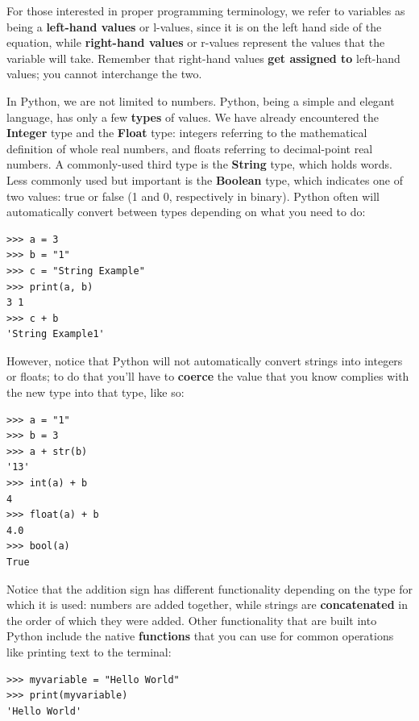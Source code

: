 \documentclass[a4paper,11pt]{article}
\begin{document}
For those interested in proper programming terminology, we refer to variables as being a \textbf{left-hand values} or l-values, 
since it is on the left hand side of the equation, while \textbf{right-hand values} or r-values represent the values that the variable
will take.  Remember that right-hand values \textbf{get assigned to} left-hand values; you cannot interchange the two. \par
In Python, we are not limited to numbers.  Python, being a simple and elegant language, has only a few \textbf{types} of
values.  We have already encountered the \textbf{Integer} type and the \textbf{Float} type: integers referring to
the mathematical definition of whole real numbers, and floats referring to decimal-point real numbers.
A commonly-used third type is the \textbf{String} type, which holds words.  Less commonly used but important is the 
\textbf{Boolean} type, which indicates one of two values: true or false (1 and 0, respectively in binary).
Python often will automatically convert between types depending on what you need to do:

\vspace{3mm}
\begin{lstlisting}
>>> a = 3
>>> b = "1"
>>> c = "String Example"
>>> print(a, b)
3 1
>>> c + b
'String Example1'
\end{lstlisting}
\vspace{3mm}

However, notice that Python will not automatically convert strings into integers or floats; to do that you'll have to \textbf{coerce} 
the value that you know complies with the new type into that type, like so:

\vspace{3mm}
\begin{lstlisting}
>>> a = "1"
>>> b = 3
>>> a + str(b)
'13'
>>> int(a) + b
4
>>> float(a) + b
4.0
>>> bool(a)
True
\end{lstlisting}
\vspace{3mm}

Notice that the addition sign has different functionality depending on the type for which it is used: numbers are
added together, while strings are \textbf{concatenated} in the order of which they were added.  Other functionality
that are built into Python include the native \textbf{functions} that you can use for common operations like 
printing text to the terminal:

\vspace{3mm}
\begin{lstlisting}
>>> myvariable = "Hello World"
>>> print(myvariable)
'Hello World'
\end{lstlisting}
\vspace{3mm}
\end{document}
